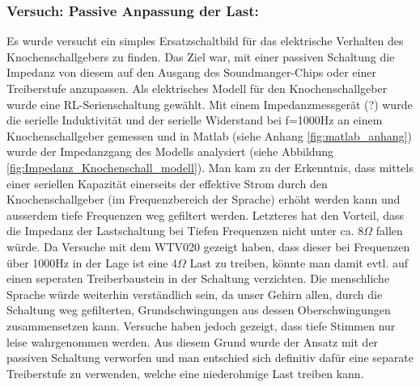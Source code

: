   
  \clearpage
  
  \subsubsection{Versuch: Passive Anpassung der Last:}
  Es wurde versucht ein simples Ersatzschaltbild für das elektrische Verhalten des Knochenschallgebers zu finden. 
  Das Ziel war, mit einer passiven Schaltung die Impedanz von diesem auf den Ausgang des Soundmanger-Chips oder einer Treiberstufe anzupassen. 
  Als elektrisches Modell für den Knochenschallgeber wurde eine RL-Serienschaltung gewählt. 
  Mit einem Impedanzmessgerät (?) wurde die serielle Induktivität und der serielle Widerstand bei f=1000Hz an einem Knochenschallgeber gemessen und in Matlab (siehe Anhang \ref{fig:matlab_anhang}) wurde der Impedanzgang des Modells analysiert (siehe Abbildung \ref{fig:Impedanz_Knochenschall_modell}). 
  Man kam zu der Erkenntnis, dass mittels einer seriellen Kapazität einerseits der effektive Strom durch den Knochenschallgeber (im Frequenzbereich der Sprache) erhöht werden kann und ausserdem tiefe Frequenzen weg gefiltert werden. 
  Letzteres hat den Vorteil, dass die Impedanz der Lastschaltung bei Tiefen Frequenzen nicht unter ca. 8\(\Omega\) fallen würde. Da Versuche mit dem WTV020 gezeigt haben, dass dieser bei Frequenzen über 1000Hz in der Lage ist eine 4\(\Omega\) Last zu treiben,
   könnte man damit evtl. auf einen seperaten Treiberbaustein in der Schaltung verzichten. 
  Die menschliche Sprache würde weiterhin verständlich sein, da unser Gehirn allen, durch die Schaltung weg gefilterten, Grundschwingungen aus dessen Oberschwingungen zusammensetzen kann. 
  Versuche haben jedoch gezeigt, dass tiefe Stimmen nur leise wahrgenommen werden. 
  Aus diesem Grund wurde der Ansatz mit der passiven Schaltung verworfen und man entschied sich definitiv dafür eine separate Treiberstufe zu verwenden, welche eine niederohmige Last treiben kann.
  
